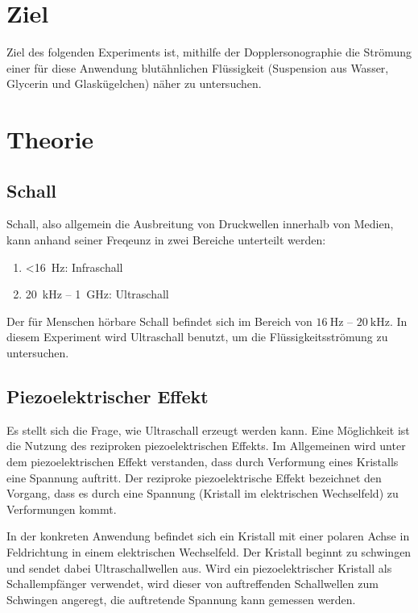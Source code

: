 \section{Ziel}
Ziel des folgenden Experiments ist, mithilfe der Dopplersonographie die Strömung einer für diese Anwendung blutähnlichen Flüssigkeit (Suspension aus Wasser, Glycerin und Glaskügelchen) näher zu untersuchen.

\section{Theorie}
\label{sec:theorie}
\subsection{Schall}
Schall, also allgemein die Ausbreitung von Druckwellen innerhalb von Medien, kann anhand seiner Freqeunz in zwei Bereiche unterteilt werden:
\begin{enumerate}
  \item <\SI{16}{\Hz}: Infraschall
  \item \SI{20}{\kilo\Hz} -- \SI{1}{\giga\Hz}: Ultraschall
\end{enumerate}
Der für Menschen hörbare Schall befindet sich im Bereich von $\SI{16}{\Hz}$ -- $\SI{20}{\kilo\Hz}$. In diesem Experiment wird Ultraschall benutzt, um die Flüssigkeitsströmung zu untersuchen.

\subsection{Piezoelektrischer Effekt}
Es stellt sich die Frage, wie Ultraschall erzeugt werden kann. Eine Möglichkeit ist die Nutzung des reziproken piezoelektrischen Effekts.
Im Allgemeinen wird unter dem piezoelektrischen Effekt verstanden, dass durch Verformung eines Kristalls eine Spannung auftritt. Der reziproke piezoelektrische Effekt bezeichnet den Vorgang, dass es durch eine Spannung (Kristall im elektrischen Wechselfeld) zu Verformungen kommt.

In der konkreten Anwendung befindet sich ein Kristall mit einer polaren Achse in Feldrichtung in einem elektrischen Wechselfeld. Der Kristall beginnt zu schwingen und sendet dabei Ultraschallwellen aus. Wird ein piezoelektrischer Kristall als Schallempfänger verwendet, wird dieser von auftreffenden Schallwellen zum Schwingen angeregt, die auftretende Spannung kann gemessen werden.

